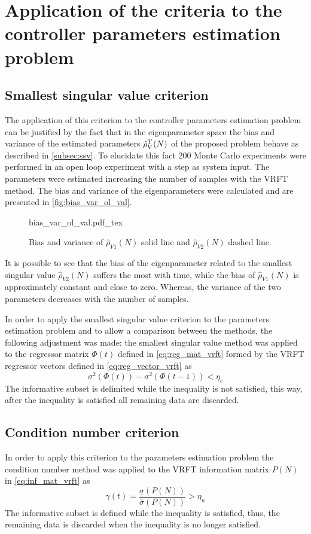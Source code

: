 
\section{\label{sec:application} Application of the criteria to the controller parameters estimation problem}

\subsection{Smallest singular value criterion}
The application of this criterion to the controller parameters estimation problem can be justified by the fact that in the eigenparameter space the bias and variance of the estimated parameters $\hat{\rho}_{V}^\text{T}(N)$ of the proposed problem behave as described in \autoref{subsec:ssv}.
To elucidate this fact 200 Monte Carlo experiments were performed in an open loop experiment with a step as system input.
The parameters were estimated increasing the number of samples with the VRFT method.
The bias and variance of the eigenparameters were calculated and are presented in \autoref{fig:bias_var_ol_val}.
\begin{figure}[h!]
  \centering
  \def\svgwidth{\columnwidth}
  {\footnotesize{bias_var_ol_val.pdf_tex}}
  \caption{\label{fig:bias_var_ol_val} Bias and variance of $\hat{\rho}_{V1}(N)$ solid line and $\hat{\rho}_{V2}(N)$ dashed line.}
\end{figure}

It is possible to see that the bias of the eigenparameter related to the smallest singular value $\hat{\rho}_{V2}(N)$ suffers the most with time, while the bias of $\hat{\rho}_{V1}(N)$ is approximately constant and close to zero.
Whereas, the variance of the two parameters decreases with the number of samples.

In order to apply the smallest singular value criterion to the parameters estimation problem and to allow a comparison between the methods, the following adjustment was made:
the smallest singular value method was applied to the regressor matrix $\Phi(t)$ defined in \eqref{eq:reg_mat_vrft} formed by the VRFT regressor vectors defined in \eqref{eq:reg_vector_vrft} as
\[
  \underline{\sigma}^2(\Phi(t)) - \underline{\sigma}^2(\Phi(t-1)) < \eta_c
\]
The informative subset is delimited while the inequality is not satisfied, this way, after the inequality is satisfied all remaining data are discarded.

\subsection{Condition number criterion}
In order to apply this criterion to the parameters estimation problem the condition number method was applied to the VRFT information matrix $P(N)$ in \eqref{eq:inf_mat_vrft} as
\[
  \gamma(t) = \frac{\underline{\sigma}(P(N))}{\overline{\sigma}(P(N))} > \eta_n
\]
The informative subset is defined while the inequality is satisfied, thus, the remaining data is discarded when the inequality is no longer satisfied.

